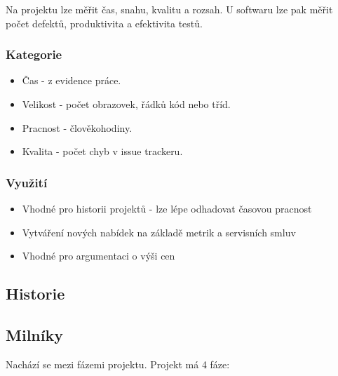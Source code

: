       Na projektu lze měřit čas, snahu, kvalitu a rozsah. U softwaru lze pak měřit počet defektů, produktivita a efektivita testů.

      \subsubsection{Kategorie}
        \begin{itemize}
          \item Čas - z evidence práce.
          \item Velikost - počet obrazovek, řádků kód nebo tříd.
          \item Pracnost - člověkohodiny.
          \item Kvalita - počet chyb v issue trackeru.
        \end{itemize}

      \subsubsection{Využití}
          \begin{itemize}
            \item Vhodné pro historii projektů - lze lépe odhadovat časovou pracnost
            \item Vytváření nových nabídek na základě metrik a servisních smluv
            \item Vhodné pro argumentaci o výši cen
          \end{itemize}

    \subsection{Historie}

    \subsection{Milníky}
      Nachází se mezi fázemi projektu. Projekt má 4 fáze:

